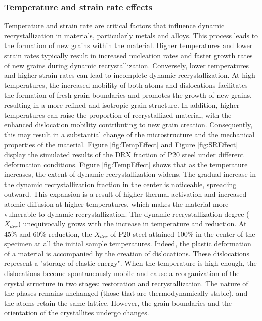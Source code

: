 \documentclass[metals,article,submit,pdftex,moreauthors]{Definitions/mdpi}
\begin{document}
\subsubsection{Temperature and strain rate effects \label{subsec:TempSReffect}}

Temperature and strain rate are critical factors that influence dynamic recrystallization in materials, particularly metals and alloys.
This process leads to the formation of new grains within the material.
Higher temperatures and lower strain rates typically result in increased nucleation rates and faster growth rates of new grains during dynamic recrystallization.
Conversely, lower temperatures and higher strain rates can lead to incomplete dynamic recrystallization.
At high temperatures, the increased mobility of both atoms and dislocations facilitates the formation of fresh grain boundaries and promotes the growth of new grains, resulting
in a more refined and isotropic grain structure.
In addition, higher temperatures can raise the proportion of recrystallized material, with the enhanced dislocation mobility contributing to new grain creation.
Consequently, this may result in a substantial change of the microstructure and the mechanical properties of the material.
Figure \ref{fig:TempEffect} and Figure \ref{fig:SREffect} display the simulated results of the DRX fraction of P20 steel under different deformation conditions.
Figure \ref{fig:TempEffect} shows that as the temperature increases, the extent of dynamic recrystallization widens.
The gradual increase in the dynamic recrystallization fraction in the center is noticeable, spreading outward.
This expansion is a result of higher thermal activation and increased atomic diffusion at higher temperatures, which makes the material more vulnerable to dynamic recrystallization.
The dynamic recrystallization degree ($X_{drx}$) unequivocally grows with the increase in temperature and reduction.
At $45\%$ and $60\%$ reduction, the $X_{drx}$ of P20 steel
attained $100\%$ in the center of the specimen at all the initial sample temperatures.
Indeed, the plastic deformation of a material is accompanied by the creation of dislocations.
These dislocations represent a "storage of elastic energy".
When the temperature is high enough, the dislocations become spontaneously mobile and cause a reorganization of the crystal structure in two stages: restoration and recrystallization.
The nature of the phases remains unchanged (those that are thermodynamically stable), and the atoms retain the same lattice.
However, the grain boundaries and the orientation of the crystallites undergo changes.
\end{document}
